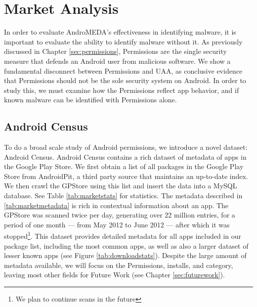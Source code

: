 \chapter{Market Analysis}
\label{sec:market}

In order to evaluate AndroMEDA's effectiveness in identifying malware, it is important to evaluate the ability to identify malware without it. As previously discussed in Chapter \ref{sec:permissions}, Permissions are the single security measure that defends an Android user from malicious software. We show a fundamental disconnect between Permissions and UAA, as conclusive evidence that Permissions should not be the sole security system on Android. In order to study this, we must examine how the Permissions reflect app behavior, and if known malware can be identified with Permissions alone.








\section{Android Census}
To do a broad scale study of Android permissions, we introduce a novel dataset: Android Census\citep{androidcensus}. Android Census contains a rich dataset of metadata of apps in the Google Play Store. We first obtain a list of all packages in the Google Play Store from AndroidPit\citep{androidpit}, a third party source that maintains an up-to-date index. We then crawl the GPStore using this list and insert the data into a MySQL database. See Table \ref{tab:marketstats} for statistics. The metadata described in \ref{tab:marketmetadata} is rich in contextual information about an app. The GPStore was scanned twice per day, generating over 22 million entries, for a period of one month --- from May 2012 to June 2012 --- after which it was stopped\footnote{We plan to continue scans in the future}. This dataset provides detailed metadata for all apps included in our package list, including the most common apps, as well as also a larger dataset of lesser known apps (see Figure \ref{tab:downloadstats}). Despite the large amount of metadata available, we will focus on the Permissions, installs, and category, leaving most other fields for Future Work (see Chapter \ref{sec:futurework}).


